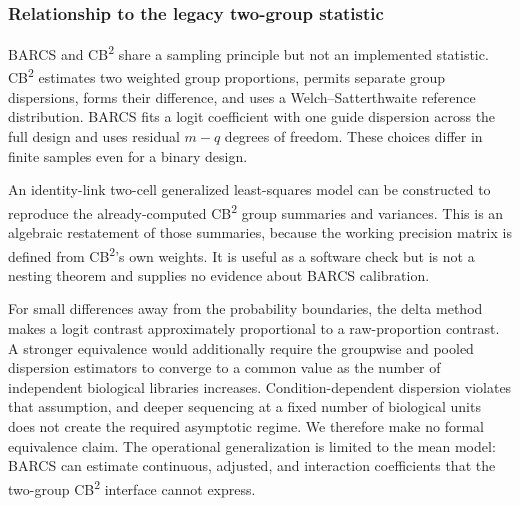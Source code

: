 \subsubsection{Relationship to the legacy two-group statistic}

BARCS and CB\textsuperscript{2} share a sampling principle but not an
implemented statistic.  CB\textsuperscript{2} estimates two weighted group
proportions, permits separate group dispersions, forms their difference, and
uses a Welch--Satterthwaite reference distribution.  BARCS fits a logit
coefficient with one guide dispersion across the full design and uses residual
$m-q$ degrees of freedom.  These choices differ in finite samples even for a
binary design.

An identity-link two-cell generalized least-squares model can be constructed
to reproduce the already-computed CB\textsuperscript{2} group summaries and
variances.  This is an algebraic restatement of those summaries, because the
working precision matrix is defined from CB\textsuperscript{2}'s own weights.
It is useful as a software check but is not a nesting theorem and supplies no
evidence about BARCS calibration.

For small differences away from the probability boundaries, the delta method
makes a logit contrast approximately proportional to a raw-proportion
contrast.  A stronger equivalence would additionally require the groupwise and
pooled dispersion estimators to converge to a common value as the number of
independent biological libraries increases.  Condition-dependent dispersion
violates that assumption, and deeper sequencing at a fixed number of
biological units does not create the required asymptotic regime.  We therefore
make no formal equivalence claim.  The operational generalization is limited
to the mean model: BARCS can estimate continuous, adjusted, and interaction
coefficients that the two-group CB\textsuperscript{2} interface cannot express.
